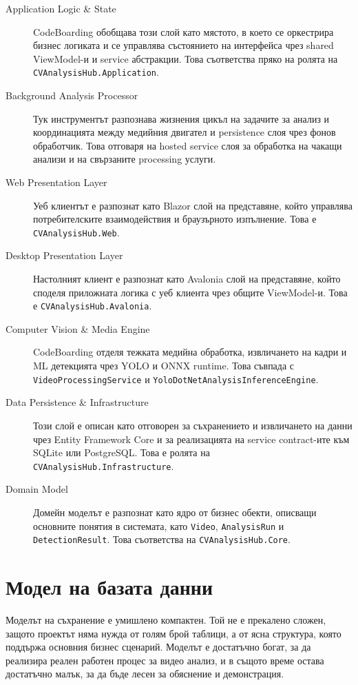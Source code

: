 \begin{description}
\item[Application Logic \& State] CodeBoarding обобщава този слой като мястото, в което се оркестрира бизнес логиката и се управлява състоянието на интерфейса чрез shared ViewModel-и и service абстракции. Това съответства пряко на ролята на \texttt{CVAnalysisHub.Application}.
\item[Background Analysis Processor] Тук инструментът разпознава жизнения цикъл на задачите за анализ и координацията между медийния двигател и persistence слоя чрез фонов обработчик. Това отговаря на hosted service слоя за обработка на чакащи анализи и на свързаните processing услуги.
\item[Web Presentation Layer] Уеб клиентът е разпознат като Blazor слой на представяне, който управлява потребителските взаимодействия и браузърното изпълнение. Това е \texttt{CVAnalysisHub.Web}.
\item[Desktop Presentation Layer] Настолният клиент е разпознат като Avalonia слой на представяне, който споделя приложната логика с уеб клиента чрез общите ViewModel-и. Това е \texttt{CVAnalysisHub.Avalonia}.
\item[Computer Vision \& Media Engine] CodeBoarding отделя тежката медийна обработка, извличането на кадри и ML детекцията чрез YOLO и ONNX runtime. Това съвпада с \texttt{VideoProcessingService} и \texttt{YoloDotNetAnalysisInferenceEngine}.
\item[Data Persistence \& Infrastructure] Този слой е описан като отговорен за съхранението и извличането на данни чрез Entity Framework Core и за реализацията на service contract-ите към SQLite или PostgreSQL. Това е ролята на \texttt{CVAnalysisHub.Infrastructure}.
\item[Domain Model] Домейн моделът е разпознат като ядро от бизнес обекти, описващи основните понятия в системата, като \texttt{Video}, \texttt{AnalysisRun} и \texttt{DetectionResult}. Това съответства на \texttt{CVAnalysisHub.Core}.
\end{description}

\section{Модел на базата данни}

Моделът на съхранение е умишлено компактен. Той не е прекалено сложен, защото проектът няма нужда от голям брой таблици, а от ясна структура, която поддържа основния бизнес сценарий. Моделът е достатъчно богат, за да реализира реален работен процес за видео анализ, и в същото време остава достатъчно малък, за да бъде лесен за обяснение и демонстрация.


